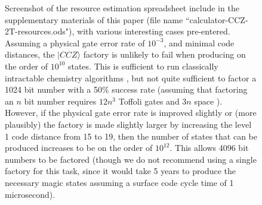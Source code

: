 \documentclass[twocolumn,accepted=2019-03-30]{quantumarticle}
\begin{document}
\begin{figure}
  \label{fig:spreadsheet}
  \caption{
    Screenshot of the resource estimation spreadsheet include in the supplementary materials of this paper (file name ``calculator-CCZ-2T-resources.ods"), with various interesting cases pre-entered.
    Assuming a physical gate error rate of $10^{-3}$, and minimal code distances, the $|CCZ\rangle$ factory is unlikely to fail when producing on the order of $10^{10}$ states.
    This is sufficient to run classically intractable chemistry algorithms \cite{babbush2018}, but not quite sufficient to factor a 1024 bit number with a 50\% success rate (assuming that factoring an $n$ bit number requires $12 n^3$ Toffoli gates and $3n$ space \cite{zalka1998fast}).
    However, if the physical gate error rate is improved slightly or (more plausibly) the factory is made slightly larger by increasing the level 1 code distance from 15 to 19, then the number of states that can be produced increases to be on the order of $10^{12}$.
    This allows 4096 bit numbers to be factored (though we do not recommend using a single factory for this task, since it would take 5 years to produce the necessary magic states assuming a surface code cycle time of 1 microsecond).
  }
\end{figure}
\end{document}
